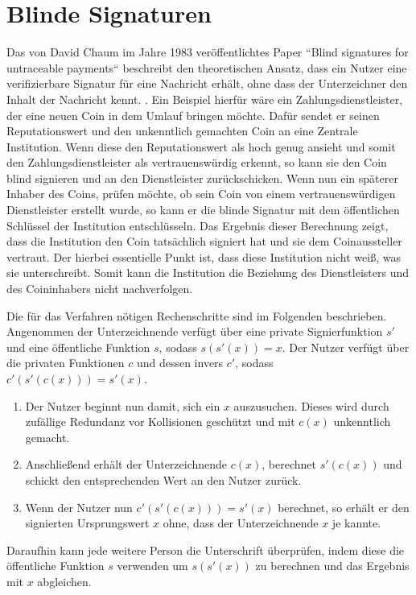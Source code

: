 \documentclass[11pt,a4paper]{scrreprt}
\begin{document}
\section{Blinde Signaturen}
\label{sec:blindSig}
Das von David Chaum im Jahre 1983 veröffentlichtes Paper ``Blind signatures for untraceable payments`` beschreibt den theoretischen Ansatz, dass ein Nutzer eine verifizierbare Signatur für eine Nachricht erhält, ohne dass der Unterzeichner den Inhalt der Nachricht kennt. \cite{chaum1983blind}. Ein Beispiel hierfür wäre ein Zahlungsdienstleister, der eine neuen Coin in dem Umlauf bringen möchte. Dafür sendet er seinen Reputationswert und den unkenntlich gemachten Coin an eine Zentrale Institution. Wenn diese den Reputationswert als hoch genug ansieht und somit den Zahlungsdienstleister als vertrauenswürdig erkennt, so kann sie den Coin blind signieren und an den Dienstleister zurückschicken. Wenn nun ein späterer Inhaber des Coins, prüfen möchte, ob sein Coin von einem vertrauenswürdigen Dienstleister erstellt wurde, so kann er die blinde Signatur mit dem öffentlichen Schlüssel der Institution entschlüsseln. Das Ergebnis dieser Berechnung zeigt, dass die Institution den Coin tatsächlich signiert hat und sie dem Coinaussteller vertraut. Der hierbei essentielle Punkt ist, dass diese Institution nicht weiß, was sie unterschreibt. Somit kann die Institution die Beziehung des Dienstleisters und des Coininhabers nicht nachverfolgen. 

Die für das Verfahren nötigen Rechenschritte sind im Folgenden beschrieben. Angenommen der Unterzeichnende verfügt über eine private Signierfunktion $s'$ und eine öffentliche Funktion $s$, sodass $s(s'(x)) = x$. Der Nutzer verfügt über die privaten Funktionen $c$ und dessen invers $c'$, sodass $c'(s'(c(x))) = s'(x)$. 
\begin{enumerate}
    \item Der Nutzer beginnt nun damit, sich ein $x$ auszusuchen. Dieses wird durch zufällige Redundanz vor Kollisionen geschützt und mit $c(x)$ unkenntlich gemacht.
    \item Anschließend erhält der Unterzeichnende $c(x)$, berechnet $s'(c(x))$ und schickt den entsprechenden Wert an den Nutzer zurück.
    \item Wenn der Nutzer nun $c'(s'(c(x))) = s'(x)$ berechnet, so erhält er den signierten Ursprungswert $x$ ohne, dass der Unterzeichnende $x$ je kannte.
\end{enumerate}
Daraufhin kann jede weitere Person die Unterschrift überprüfen, indem diese die öffentliche Funktion $s$ verwenden um $s(s'(x))$ zu berechnen und das Ergebnis mit $x$ abgleichen. 
\end{document}
